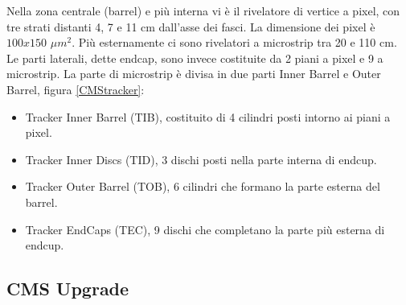 Nella zona centrale (barrel) e più interna vi è il rivelatore di vertice a pixel, con tre strati distanti 4, 7 e 11 cm dall'asse dei fasci. La dimensione dei pixel è $100x150$ $\mu m^2$. Più esternamente ci sono rivelatori a microstrip tra 20 e 110 cm. Le parti laterali, dette endcap, sono invece costituite da 2 piani a pixel e 9 a microstrip. La parte di microstrip è divisa in due parti Inner Barrel e Outer Barrel, figura \ref{CMStracker}:
\begin{itemize}
\item Tracker Inner Barrel (TIB), costituito di 4 cilindri posti intorno ai piani a pixel.
\item Tracker Inner Discs (TID), 3 dischi posti nella parte interna di endcup.
\item Tracker Outer Barrel (TOB), 6 cilindri che formano la parte esterna del barrel.
\item Tracker EndCaps (TEC), 9 dischi che completano la parte più esterna di endcup.
\end{itemize}

\subsection{CMS Upgrade}